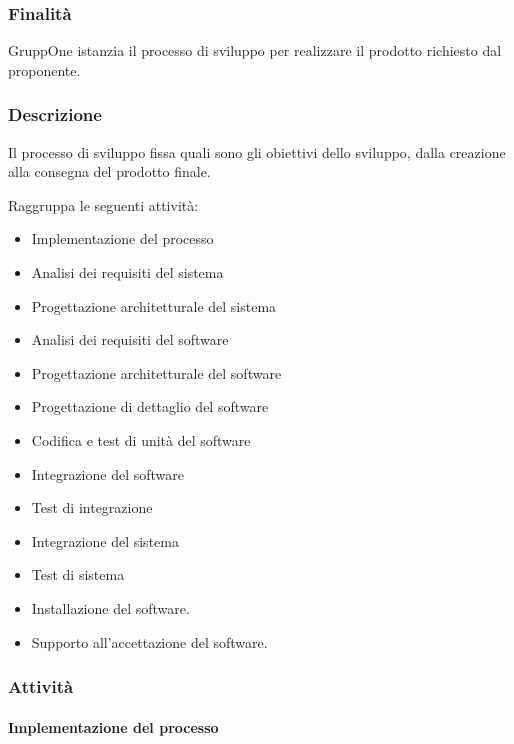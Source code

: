 \documentclass[../../norme-di-progetto.tex]{subfiles}
\begin{document}
\subsubsection{Finalità}%
\label{subs:sviluppo/finalita}

GruppOne istanzia il processo di sviluppo per realizzare il prodotto richiesto dal proponente.

\subsubsection{Descrizione}%
\label{subs:sviluppo/descrizione}

Il processo di sviluppo fissa quali sono gli obiettivi dello sviluppo, dalla creazione alla consegna del prodotto finale.

Raggruppa le seguenti attività:
\begin{itemize}
  \item Implementazione del processo
  \item Analisi dei requisiti del sistema
  \item Progettazione architetturale del sistema
  \item Analisi dei requisiti del software
  \item Progettazione architetturale del software
  \item Progettazione di dettaglio del software
  \item Codifica e test di unità del software
  \item Integrazione del software
  \item Test di integrazione
  \item Integrazione del sistema
  \item Test di sistema
  \item Installazione del software.
  \item Supporto all'accettazione del software.
\end{itemize}

\subsubsection{Attività}%
\label{subs:sviluppo/attivita}

\paragraph{Implementazione del processo}%
\label{par:sviluppo/implementazione_del_processo}
\end{document}
